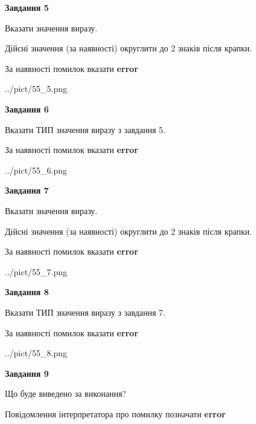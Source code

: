 \documentclass[11pt, ukrainian]{article}
\begin{document}
{\begin {large}
{\begin {center}\textbf{Завдання 5}\end {center}}\par
Вказати значення виразу. \par
Дійсні значення (за наявності) округлити до 2 знаків після крапки. \par
За наявності помилок вказати \textbf{error}

\begin{center}
	{../pict/55_5.png}
\end{center}
\newpage

{\begin {center}\textbf{Завдання 6}\end {center}}\par
Вказати ТИП значення виразу з завдання 5. \par
За наявності помилок вказати \textbf{error}

\begin{center}
	{../pict/55_6.png}
\end{center}
\newpage

{\begin {center}\textbf{Завдання 7}\end {center}}\par
Вказати значення виразу. \par
Дійсні значення (за наявності) округлити до 2 знаків після крапки. \par
За наявності помилок вказати \textbf{error}

\begin{center}
	{../pict/55_7.png}
\end{center}
\newpage

{\begin {center}\textbf{Завдання 8}\end {center}}\par
Вказати ТИП значення виразу з завдання 7. \par
За наявності помилок вказати \textbf{error}

\begin{center}
	{../pict/55_8.png}
\end{center}
\newpage

{\begin {center}\textbf{Завдання 9}\end {center}}\par
Що буде виведено за виконання? \par
Повідомлення інтерпретатора про помилку позначати \textbf{error}


\end{large}}
\end{document}
